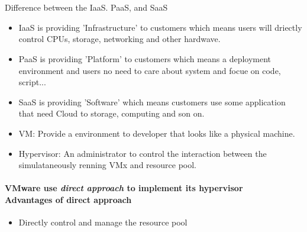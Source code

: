 \documentclass{article}
\begin{document}
    \section{}
        Difference between the IaaS. PaaS, and SaaS
        \begin{itemize}
            \item IaaS is providing 'Infrastructure' to customers which means users will driectly control CPUs, storage, networking and other hardwave.
            \item PaaS is providing 'Platform' to customers which means a deployment environment and users no need to care about system and focue on code, script...
            \item SaaS is providing 'Software' which means customers use some application that need Cloud to storage, computing and son on.
        \end{itemize}
        
        \begin{itemize}
            \item VM: Provide a environment to developer that looks like a physical machine.
            \item Hypervisor: An administrator to control the interaction between the simulataneously renning VMx and resource pool.
        \end{itemize}
        \paragraph{
            VMware use \textit{direct approach} to implement its hypervisor\\
            Advantages of direct approach
        }
        
        
        \begin{itemize}
            \item Directly control and manage the resource pool
        \end{itemize}

        
\end{document}
